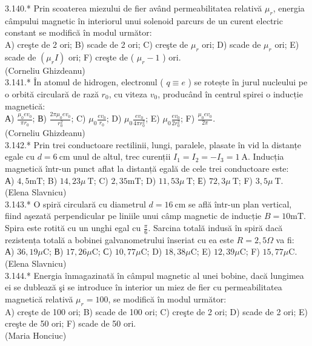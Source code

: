 \documentclass[10pt]{article}
\begin{document}
3.140.* Prin scoaterea miezului de fier având permeabilitatea relativă $\mu_{r}$, energia câmpului magnetic în interiorul unui solenoid parcurs de un curent electric constant se modifică în modul următor:\\ A) creşte de 2 ori; B) scade de 2 ori; C) creşte de $\mu_{r}$ ori; D) scade de $\mu_{r}$ ori; E) scade de $\left(\mu_{r} I\right)$ ori; F) creşte de ( $\mu_{r}-1$ ) ori.\\ (Corneliu Ghizdeanu)\\

3.141.* În atomul de hidrogen, electronul ( $q \equiv e$ ) se rotește în jurul nucleului pe o orbită circulară de rază $r_{0}$, cu viteza $v_{0}$, producând în centrul spirei o inducție magnetică:\\ А) $\frac{\mu_{0} e v_{0}}{\pi r_{0}}$; В) $\frac{2 \pi \mu_{0} e v_{0}}{r_{0}^{2}}$; C) $\mu_{0} \frac{e v_{0}}{r_{0}}$; D) $\mu_{0} \frac{e v_{0}}{4 \pi r_{0}^{2}}$; E) $\mu_{0} \frac{e v_{0}}{2 r_{0}^{2}}$; F) $\frac{\mu_{0} e v_{0}}{2 \pi}$.\\ (Corneliu Ghizdeanu)\\

3.142.* Prin trei conductoare rectilinii, lungi, paralele, plasate în vid la distanțe egale cu $d=6 \mathrm{~cm}$ unul de altul, trec curenții $I_{1}=I_{2}=-I_{3}=1 \mathrm{~A}$. Inducția magnetică într-un punct aflat la distanță egală de cele trei conductoare este:\\ А) $4,5 \mathrm{mT}$; B) $14,23 \mu \mathrm{~T}$; C) $2,35 \mathrm{mT}$; D) $11,53 \mu \mathrm{~T}$; Е) $72,3 \mu \mathrm{~T}$; F) $3,5 \mu \mathrm{~T}$.\\ (Elena Slavnicu)\\

3.143.* O spiră circulară cu diametrul $d=16 \mathrm{~cm}$ se află într-un plan vertical, fiind aşezată perpendicular pe liniile unui câmp magnetic de inducție $B=10 \mathrm{mT}$. Spira este rotită cu un unghi egal cu $\frac{\pi}{6}$. Sarcina totală indusă în spiră dacă rezistența totală a bobinei galvanometrului înseriat cu ea este $R=2,5 \Omega$ va fi:\\ А) $36,19 \mu \mathrm{C}$; В) $17,26 \mu \mathrm{C}$; С) $10,77 \mu \mathrm{C}$; D) $18,38 \mu \mathrm{C}$; E) $12,39 \mu \mathrm{C}$; F) $15,77 \mu \mathrm{C}$.\\ (Elena Slavnicu)\\

3.144.* Energia înmagazinată în câmpul magnetic al unei bobine, dacă lungimea ei se dublează şi se introduce în interior un miez de fier cu permeabilitatea magnetică relativă $\mu_{r}=100$, se modifică în modul următor:\\ A) creşte de 100 ori; B) scade de 100 ori; C) creşte de 2 ori; D) scade de 2 ori; E) creşte de 50 ori; F) scade de 50 ori.\\ (Maria Honciuc)\\
\end{document}
